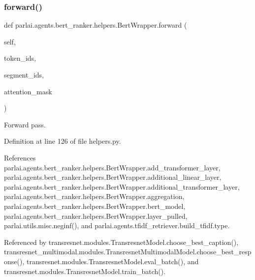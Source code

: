 \subsubsection{\texorpdfstring{forward()}{forward()}}
{\footnotesize\ttfamily def parlai.\+agents.\+bert\+\_\+ranker.\+helpers.\+Bert\+Wrapper.\+forward (\begin{DoxyParamCaption}\item[{}]{self,  }\item[{}]{token\+\_\+ids,  }\item[{}]{segment\+\_\+ids,  }\item[{}]{attention\+\_\+mask }\end{DoxyParamCaption})}

\begin{DoxyVerb}Forward pass.\end{DoxyVerb}
 

Definition at line 126 of file helpers.\+py.



References parlai.\+agents.\+bert\+\_\+ranker.\+helpers.\+Bert\+Wrapper.\+add\+\_\+transformer\+\_\+layer, parlai.\+agents.\+bert\+\_\+ranker.\+helpers.\+Bert\+Wrapper.\+additional\+\_\+linear\+\_\+layer, parlai.\+agents.\+bert\+\_\+ranker.\+helpers.\+Bert\+Wrapper.\+additional\+\_\+transformer\+\_\+layer, parlai.\+agents.\+bert\+\_\+ranker.\+helpers.\+Bert\+Wrapper.\+aggregation, parlai.\+agents.\+bert\+\_\+ranker.\+helpers.\+Bert\+Wrapper.\+bert\+\_\+model, parlai.\+agents.\+bert\+\_\+ranker.\+helpers.\+Bert\+Wrapper.\+layer\+\_\+pulled, parlai.\+utils.\+misc.\+neginf(), and parlai.\+agents.\+tfidf\+\_\+retriever.\+build\+\_\+tfidf.\+type.



Referenced by transresnet.\+modules.\+Transresnet\+Model.\+choose\+\_\+best\+\_\+caption(), transresnet\+\_\+multimodal.\+modules.\+Transresnet\+Multimodal\+Model.\+choose\+\_\+best\+\_\+response(), transresnet.\+modules.\+Transresnet\+Model.\+eval\+\_\+batch(), and transresnet.\+modules.\+Transresnet\+Model.\+train\+\_\+batch().

